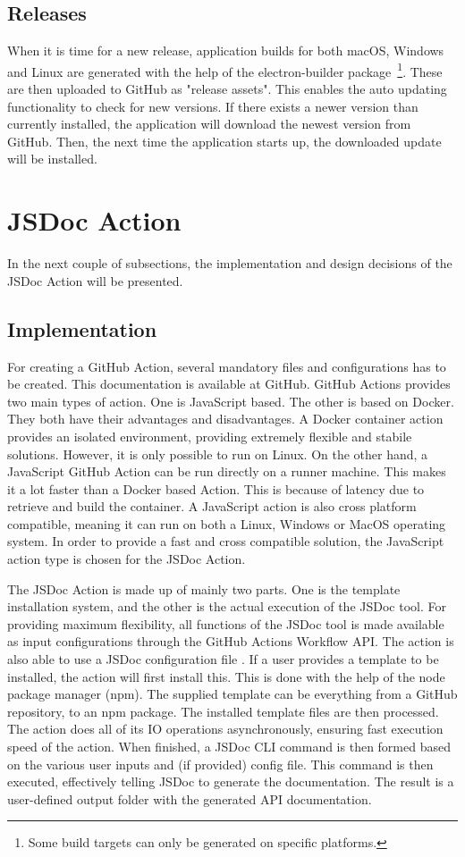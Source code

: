 \subsection{Releases}
When it is time for a new release, application builds for both macOS, Windows and Linux are generated with the help of the electron-builder package~\footnote{Some build targets can only be generated on specific platforms.}. These are then uploaded to GitHub as "release assets".
This enables the auto updating functionality to check for new versions. If there exists a newer version than currently installed, the application will download the newest version from GitHub. Then, the next time the application starts up, the downloaded update will be installed.

\section{JSDoc Action}
In the next couple of subsections, the implementation and design decisions of the JSDoc Action will be presented.
\subsection{Implementation}
For creating a GitHub Action, several mandatory files and configurations has to be created. This documentation is available at GitHub. GitHub Actions provides two main types of action. One is JavaScript based. The other is based on Docker. They both have their advantages and disadvantages. A Docker container action provides an isolated environment, providing extremely flexible and stabile solutions. However, it is only possible to run on Linux. On the other hand, a JavaScript GitHub Action can be run directly on a runner machine. This makes it a lot faster than a Docker based Action. This is because of latency due to retrieve and build the container. A JavaScript action is also cross platform compatible, meaning it can run on both a Linux, Windows or MacOS operating system. In order to provide a fast and cross compatible solution, the JavaScript action type is chosen for the JSDoc Action.

The JSDoc Action is made up of mainly two parts. One is the template installation system, and the other is the actual execution of the JSDoc tool. For providing maximum flexibility, all functions of the JSDoc tool is made available as input configurations through the GitHub Actions Workflow API. The action is also able to use a JSDoc configuration file \cite{jsdoc-config-file}. If a user provides a template to be installed, the action will first install this. This is done with the help of the node package manager (npm). The supplied template can be everything from a GitHub repository, to an npm package. The installed template files are then processed. The action does all of its IO operations asynchronously, ensuring fast execution speed of the action. When finished, a JSDoc CLI command is then formed based on the various user inputs and (if provided) config file. This command is then executed, effectively telling JSDoc to generate the documentation. The result is a user-defined output folder with the generated API documentation.

